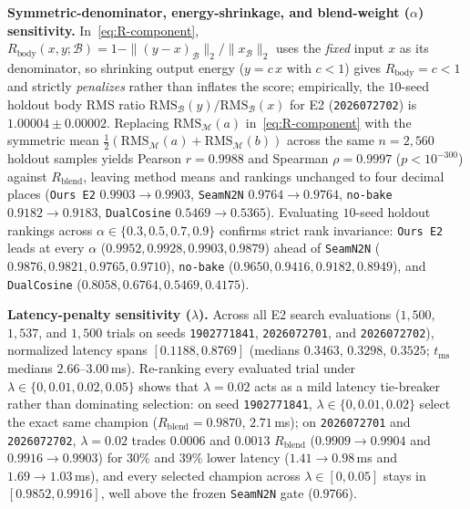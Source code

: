 \textbf{Symmetric-denominator, energy-shrinkage, and blend-weight ($\alpha$) sensitivity.}
In~\eqref{eq:R-component}, $R_{\mathrm{body}}(x,y;\mathcal{B})=1-\|(y-x)_{\mathcal{B}}\|_2/\|x_{\mathcal{B}}\|_2$ uses the \emph{fixed} input $x$ as its denominator, so shrinking output energy ($y{=}c\,x$ with $c<1$) gives $R_{\mathrm{body}}=c<1$ and strictly \emph{penalizes} rather than inflates the score; empirically, the $10$-seed holdout body RMS ratio $\mathrm{RMS}_{\mathcal{B}}(y)/\mathrm{RMS}_{\mathcal{B}}(x)$ for E2 (\texttt{2026072702}) is $1.00004{\pm}0.00002$.
Replacing $\mathrm{RMS}_{\mathcal{M}}(a)$ in~\eqref{eq:R-component} with the symmetric mean $\tfrac{1}{2}(\mathrm{RMS}_{\mathcal{M}}(a)+\mathrm{RMS}_{\mathcal{M}}(b))$ across the same $n{=}2{,}560$ holdout samples yields Pearson $r{=}0.9988$ and Spearman $\rho{=}0.9997$ ($p{<}10^{-300}$) against $R_{\mathrm{blend}}$, leaving method means and rankings unchanged to four decimal places (\texttt{Ours E2} $0.9903\to0.9903$, \texttt{SeamN2N} $0.9764\to0.9764$, \texttt{no-bake} $0.9182\to0.9183$, \texttt{DualCosine} $0.5469\to0.5365$).
Evaluating $10$-seed holdout rankings across $\alpha\in\{0.3,0.5,0.7,0.9\}$ confirms strict rank invariance: \texttt{Ours E2} leads at every $\alpha$ ($0.9952,0.9928,0.9903,0.9879$) ahead of \texttt{SeamN2N} ($0.9876,0.9821,0.9765,0.9710$), \texttt{no-bake} ($0.9650,0.9416,0.9182,0.8949$), and \texttt{DualCosine} ($0.8058,0.6764,0.5469,0.4175$).

\textbf{Latency-penalty sensitivity ($\lambda$).}
Across all E2 search evaluations ($1{,}500$, $1{,}537$, and $1{,}500$ trials on seeds \texttt{1902771841}, \texttt{2026072701}, and \texttt{2026072702}), normalized latency spans $[0.1188,0.8769]$ (medians $0.3463$, $0.3298$, $0.3525$; $t_{\mathrm{ms}}$ medians $2.66$--$3.00$\,ms).
Re-ranking every evaluated trial under $\lambda\in\{0,0.01,0.02,0.05\}$ shows that $\lambda{=}0.02$ acts as a mild latency tie-breaker rather than dominating selection: on seed \texttt{1902771841}, $\lambda\in\{0,0.01,0.02\}$ select the exact same champion ($R_{\mathrm{blend}}{=}0.9870$, $2.71$\,ms); on \texttt{2026072701} and \texttt{2026072702}, $\lambda{=}0.02$ trades $0.0006$ and $0.0013$ $R_{\mathrm{blend}}$ ($0.9909\to0.9904$ and $0.9916\to0.9903$) for $30\%$ and $39\%$ lower latency ($1.41\to0.98$\,ms and $1.69\to1.03$\,ms), and every selected champion across $\lambda\in[0,0.05]$ stays in $[0.9852,0.9916]$, well above the frozen \texttt{SeamN2N} gate ($0.9766$).

